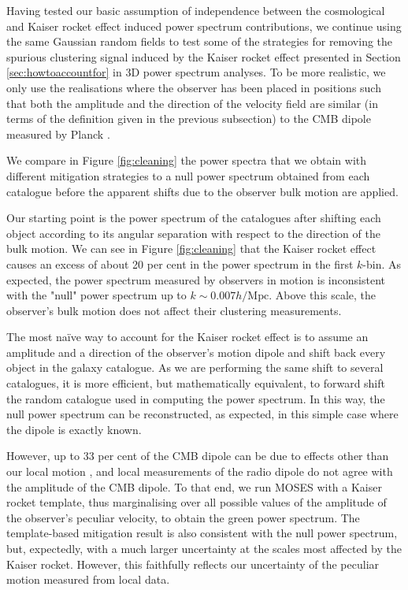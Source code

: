 \documentclass[a4paper,11pt]{article}
\begin{document}
 Having tested our basic assumption of independence between the cosmological and Kaiser rocket effect induced power spectrum contributions, we continue using the same Gaussian random fields to test some of the strategies for removing the spurious clustering signal induced by the Kaiser rocket effect presented in Section \ref{sec:howtoaccountfor} in 3D power spectrum analyses. To be more realistic, we only use the realisations where the observer has been placed in positions such that both the amplitude and the direction of the velocity field are similar (in terms of the definition given in the previous subsection) to the CMB dipole measured by Planck \cite{Akrami:2018vks}.

We compare in Figure \ref{fig:cleaning} the power spectra that we obtain with different mitigation strategies to a null power spectrum obtained from each catalogue  before the apparent shifts due to the observer bulk motion are applied. 

 Our starting point is the power spectrum of the catalogues after shifting each object according to its angular separation with respect to the direction of the bulk motion. We can see in Figure \ref{fig:cleaning} that the Kaiser rocket effect causes an excess of about 20 per cent in the power spectrum in the first $k$-bin. As expected, the power spectrum measured by observers in motion is inconsistent with the "null" power spectrum up to $k\sim 0.007 h/\mathrm{Mpc}$. Above this scale, the observer's bulk motion does not affect their clustering measurements.


 The most na\"ive way to account for the Kaiser rocket effect is to assume an amplitude and a direction of the observer's motion dipole and shift back every object in the galaxy catalogue. As we are performing the same shift to several catalogues, it is more efficient, but mathematically equivalent, to forward shift the random catalogue used in computing the power spectrum. In this way, the null power spectrum can be reconstructed, as expected, in this simple case where the dipole is exactly known. 
 
 However, up to 33 per cent of the CMB dipole can be due to effects other than our local motion \cite{Saha:2021bay}, and local measurements of the radio dipole \cite{Blake:2002gx,Singal:2011dy,Gibelyou:2012ri,Rubart:2013tx,Kothari:2013gya,Tiwari:2013ima,Tiwari:2015tba} do not agree with the amplitude of the CMB dipole. To that end, we run MOSES with a Kaiser rocket template, thus marginalising over all possible values of the amplitude of the observer's peculiar velocity, to obtain the green power spectrum. The template-based mitigation result is also consistent with the null power spectrum, but, expectedly, with a much larger uncertainty at the scales most affected by the Kaiser rocket. However, this faithfully reflects our uncertainty of the peculiar motion measured from local data.
\end{document}
